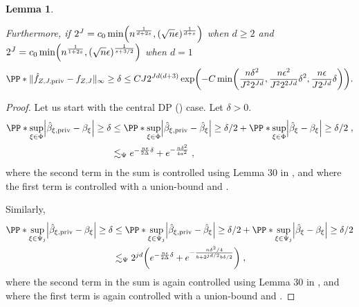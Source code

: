 \documentclass{article}
\newcommand{\1}{\mathds{1}}
\DeclarePairedDelimiter{\abs}{\lvert}{\rvert}
\DeclarePairedDelimiter{\paren}{\lparen}{\rparen}
\theoremstyle{plain}
\newtheorem{lemma}{Lemma}[section]
\theoremstyle{definition}
\theoremstyle{remark}
\begin{document}
\begin{lemma}
\begin{itemize}
\begin{equation}
        \end{equation}
        Furthermore, if $2^J = c_0 \min \paren*{n^{\frac{1}{d + 2s}}, (\sqrt{n} \epsilon)^{\frac{1}{d+s}}}$ when $d \geq 2$ and $2^J = c_0 \min \paren*{n^{\frac{1}{1 + 2s}}, (\sqrt{n} \epsilon)^{\frac{1}{s + 3/2}}}$ when $d=1$ 
        \begin{equation}
\label{eq:linfty-simple}
\PP*{\| \hat{f}_{Z, J, \textrm{priv}} - f_{Z, J} \|_{\infty} \geq \delta}
\leq
C J 2^{Jd(d+3)} \exp \paren*{-C \min \paren*{\frac{n\delta^2}{J^2 2^{Jd}}, \frac{n\epsilon^2}{J^2 2^{2Jd}}\delta^2, \frac{n\epsilon}{J2^{Jd}}\delta}} .
\end{equation}
    \end{itemize}
\end{lemma}
\begin{proof}
Let us start with the central DP () case.
Let $\delta>0$.
\begin{equation}
\begin{aligned}
    \PP*{\sup_{\xi \in \Phi} \abs*{\hat{\beta}_{\xi, \textrm{priv}} - {\beta}_{\xi}} \geq \delta} 
    &\leq 
    \PP*{\sup_{\xi \in \Phi} \abs*{\hat{\beta}_{\xi, \textrm{priv}} - \hat{\beta}_{\xi}} \geq \delta/2} 
    +
    \PP*{\sup_{\xi \in \Phi} \abs*{\hat{\beta}_{\xi} - {\beta}_{\xi}} \geq \delta/2}\;,\\
    &\lesssim_{\Psi} e^{- \frac{n \epsilon}{2 \Delta} \delta} + e^{- \frac{n \delta^2}{4a^2}}  \;,
\end{aligned}
\end{equation}
where the second term in the sum is controlled using Lemma 30 in \cite{Manole2024Plugin}, and where the first term is controlled with a union-bound and .

Similarly, 
\begin{equation}
\begin{aligned}
    \PP*{\sup_{\xi \in \Psi_j} \abs*{\hat{\beta}_{\xi, \textrm{priv}} - {\beta}_{\xi}} \geq \delta} 
    &\leq 
    \PP*{\sup_{\xi \in \Psi_j} \abs*{\hat{\beta}_{\xi, \textrm{priv}} - \hat{\beta}_{\xi}} \geq \delta/2} +
    \PP*{\sup_{\xi \in \Psi_j} \abs*{\hat{\beta}_{\xi} - {\beta}_{\xi}} \geq \delta/2} \\
    &\lesssim_{\Psi} 2^{jd} \paren*{e^{- \frac{n \epsilon}{2 \Delta} \delta}  + e^{- \frac{n \delta^2 / 4}{b+2^{jd/2} b \delta/2}} }\;,
\end{aligned}
\end{equation}
where the second term in the sum is again controlled using Lemma 30 in \cite{Manole2024Plugin}, and where the first term is again controlled with a union-bound and .


\end{proof}
\end{document}
